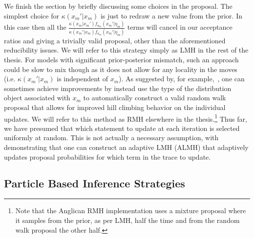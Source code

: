 We finish the section by briefly discussing some choices in the proposal.  The simplest choice for
$\kappa(x_m'|x_m)$ is just to redraw a new value from the prior.  In this case then all the 
$\frac{\kappa(x_m | x_{m}') f_{a_m} (x_m' | \eta_m)} {\kappa(x_m' | x_{m}) f_{a_m} (x_m' | \eta_m)}$ terms
will cancel in our acceptance ratios and giving a trivially valid proposal, other than the aforementioned 
reducibility issues.  We will refer to this strategy simply
as LMH in the rest of the thesis.  For models with significant prior-posterior mismatch, such an approach could be
slow to mix though as it does not allow for any locality in the moves (i.e. $\kappa(x_m'|x_m)$ is independent of $x_m$).
As suggested by, for example,~\cite{le2015rmh}, one can sometimes achieve improvements by instead use the type of the 
distribution object associated with $x_m$ to automatically construct a valid random walk proposal that allows for 
improved hill climbing
behavior on the individual updates.  We will refer to this method as RMH elsewhere in the thesis.\footnote{Note that
	the Anglican RMH implementation uses a mixture proposal where it samples from the prior, as per LMH, half the time
	and from the random walk proposal the other half.}  Thus far, we have
presumed that which \sample statement to update at each iteration is selected uniformly at random.  This is not
actually a necessary assumption, with~\cite{tolpin2015output} demonstrating that one can construct an adaptive LMH (ALMH)
that adaptively updates proposal probabilities for which term in the trace to update.

\subsection{Particle Based Inference Strategies}
\label{sec:proginf:str:part}

